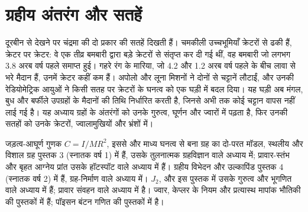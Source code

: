 \chapter{ग्रहीय अंतरंग और सतहें}\label{ch:b3:planetary-interiors-surfaces}

दूरबीन से देखने पर चंद्रमा की दो प्रकार की सतहें दिखती हैं। चमकीली
उच्चभूमियाँ क्रेटरों से ढकी हैं, क्रेटर पर क्रेटर: वे एक तीव्र बमबारी द्वारा
बड़े क्रेटरों से संतृप्त कर दी गई थीं, वह बमबारी जो लगभग 3.8 अरब
वर्ष पहले समाप्त हुई। गहरे रंग के मारिया, जो 4.2 और 1.2 अरब
वर्ष पहले के बीच लावा से भरे मैदान हैं, उनमें क्रेटर कहीं कम हैं। अपोलो और लूना
मिशनों ने दोनों से चट्टानें लौटाईं, और उनकी रेडियोमेट्रिक आयुओं ने
किसी सतह पर क्रेटरों के घनत्व को एक घड़ी में बदल दिया। यह घड़ी अब मंगल, बुध
और बर्फीले उपग्रहों के मैदानों की तिथि निर्धारित करती है, जिनसे अभी तक कोई चट्टान
वापस नहीं लाई गई है। यह अध्याय ग्रहों के अंतरंगों को उनके गुरुत्व,
घूर्णन और ज्वारों में पढ़ता है, फिर उनकी सतहों को उनके क्रेटरों,
ज्वालामुखियों और भ्रंशों में।

\begin{recall}
जड़त्व-आघूर्ण गुणक $C = I/MR^2$, इससे और माध्य घनत्व से बना ग्रह का दो-परत मॉडल,
स्थलीय और विशाल ग्रह पुस्तक 3 (स्नातक वर्ष 1) में हैं, उसके तुलनात्मक
ग्रहविज्ञान वाले अध्याय में; प्रावार-स्तंभ और बृहत आग्नेय प्रांत
उसके हॉटस्पॉट वाले अध्याय में हैं। ग्रहीय विभेदन और उल्कापिंड
पुस्तक 4 (स्नातक वर्ष 2) में हैं, ग्रह-निर्माण वाले अध्याय में।
 $J_2$,  और  इस पुस्तक में
उसके गुरुत्व और भूगणित वाले अध्याय में हैं; 
प्रावार संवहन वाले अध्याय में है। ज्वार, केप्लर के नियम और
प्रत्यास्थ मापांक भौतिकी की पुस्तकों में हैं;
पॉइसन बंटन
गणित की पुस्तकों में है।
\end{recall}

